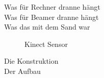 \begin{Spacing}{\mylinespace}
Was für Rechner dranne hängt\\
Was für Beamer dranne hängt\\
Was das mit dem Sand war\\

\begin{figure}[hbtp]
	\centering
	\hfill
	\caption{Kinect Sensor}
\end{figure}

Die Konstruktion\\
Der Aufbau

\end{Spacing}
\newpage
\clearpage
